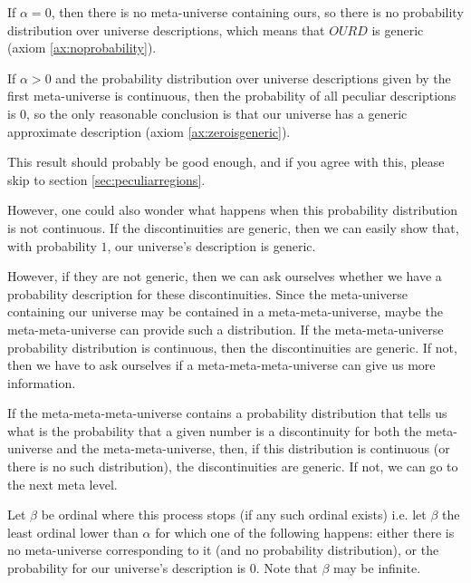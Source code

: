 \documentclass[a4paper
,draft
]{article}
\def\descriptions{D_L}
\def\our_description{OURD}
\begin{document}
If $\alpha = 0$, then there is no meta-universe containing ours, so there
is no probability distribution over universe descriptions,
which means that $\our_description$ is generic (axiom \ref{ax:noprobability}).

If $\alpha > 0$ and the probability distribution over universe descriptions
given by the first meta-universe is continuous,
then the probability of all peculiar descriptions is $0$,
so the only reasonable conclusion is that our universe has a generic
approximate description (axiom \ref{ax:zeroisgeneric}).

This result should probably be good enough, and if you agree with
this, please skip to section \ref{sec:peculiarregions}.

However, one could also wonder what happens when this probability distribution
is not continuous. If the discontinuities are generic, then we can easily
show that, with probability $1$, our universe's description is generic.

However, if they are not generic, then we can ask ourselves
whether we have a probability
description for these discontinuities. Since the meta-universe containing our
universe may be contained in a meta-meta-universe, maybe the meta-meta-universe
can provide such a distribution. If the meta-meta-universe probability
distribution is continuous, then the discontinuities are generic. If not,
then we have to ask ourselves if a meta-meta-meta-universe can give us more
information.

If the meta-meta-meta-universe contains a probability distribution that tells
us what is the probability that a given number is a discontinuity for both
the meta-universe and the meta-meta-universe, then, if this distribution
is continuous (or there is no such distribution),
the discontinuities are generic. If not, we can go to the next meta level.

Let $\beta$ be ordinal where this process stops (if any such ordinal exists)
i.e. let $\beta$ the least ordinal lower than $\alpha$
for which one of the following happens:
either there is no meta-universe corresponding to it
(and no probability distribution), or the probability for our universe's
description is $0$. Note that $\beta$ may be infinite.

\end{document}
